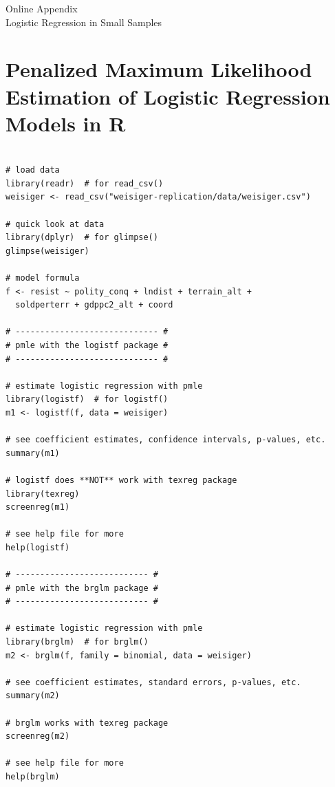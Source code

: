 \documentclass[12pt]{article}
\begin{document}
\newpage
\begin{appendix}
\begin{center}
{\LARGE Online Appendix}\\
{\large Logistic Regression in Small Samples}\\\vspace{2mm}
\end{center}


\section{Penalized Maximum Likelihood Estimation of Logistic Regression Models in R}\label{sec:pmle-in-R}

\begin{verbatim}

# load data
library(readr)  # for read_csv()
weisiger <- read_csv("weisiger-replication/data/weisiger.csv")

# quick look at data
library(dplyr)  # for glimpse()
glimpse(weisiger)

# model formula
f <- resist ~ polity_conq + lndist + terrain_alt + 
  soldperterr + gdppc2_alt + coord

# ----------------------------- #
# pmle with the logistf package #
# ----------------------------- #

# estimate logistic regression with pmle
library(logistf)  # for logistf()
m1 <- logistf(f, data = weisiger)

# see coefficient estimates, confidence intervals, p-values, etc.
summary(m1)

# logistf does **NOT** work with texreg package
library(texreg)
screenreg(m1)

# see help file for more
help(logistf)

# --------------------------- #
# pmle with the brglm package #
# --------------------------- #

# estimate logistic regression with pmle
library(brglm)  # for brglm()
m2 <- brglm(f, family = binomial, data = weisiger)

# see coefficient estimates, standard errors, p-values, etc.
summary(m2)

# brglm works with texreg package
screenreg(m2)

# see help file for more
help(brglm)
\end{verbatim}



\end{appendix}
\end{document}
